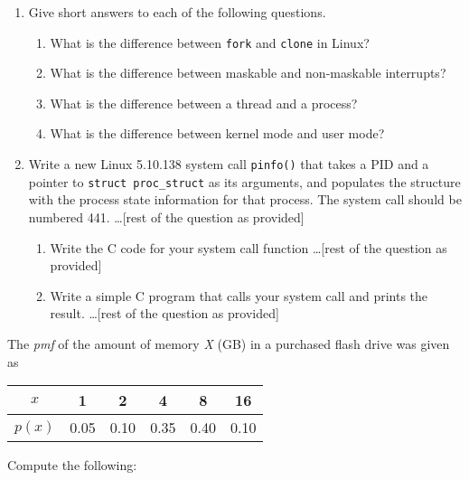 \documentclass[letterpaper,12pt,addpoints]{exam}
\begin{document}
\begin{questions}
\begin{enumerate}
\begin{enumerate}
        \item You are now told that due to a new change in x99, there are high priority interrupts \ldots [rest of the question as provided]
    \end{enumerate}
    \item Give short answers to each of the following questions.
    \begin{enumerate}
        \item What is the difference between \texttt{fork} and \texttt{clone} in Linux?
        \item What is the difference between maskable and non-maskable interrupts?
        \item What is the difference between a thread and a process?
        \item What is the difference between kernel mode and user mode?
    \end{enumerate}
    \item Write a new Linux 5.10.138 system call \texttt{pinfo()} that takes a PID and a pointer to \texttt{struct proc\_struct} as its arguments, and populates the structure with the process state information for that process. The system call should be numbered 441. \ldots [rest of the question as provided]
    \begin{enumerate}
        \item Write the C code for your system call function \ldots [rest of the question as provided]
        \item Write a simple C program that calls your system call and prints the result. \ldots [rest of the question as provided]
    \end{enumerate}
\end{enumerate}

\clearpage
\question
The \textit{pmf} of the amount of memory \textit{X} (GB) in a purchased flash drive was given as
\begin{center}
\begin{tabular}{c|c|c|c|c|c} 
 $x$ & 1 & 2 & 4 & 8 & 16 \\
 \hline
 $p(x)$ & 0.05 & 0.10 & 0.35 & 0.40 & 0.10\\  
\end{tabular}
\end{center}
Compute the following:
\end{questions}
\end{document}
